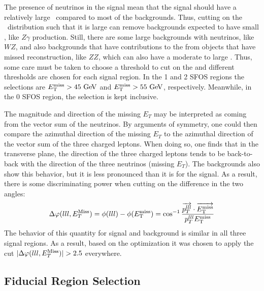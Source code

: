 The presence of neutrinos in the signal mean that the signal should have a 
relatively large \MET~compared to most of the backgrounds. Thus, 
cutting on the \MET~distribution such that it is large can remove backgrounds
expected to have small \MET, like $Z\gamma$ production.
Still, there are some large backgrounds with neutrinos, like $WZ$, 
and also backgrounds that have contributions to the \MET from objects that have
missed reconstruction, like $ZZ$, which can also have a moderate to large \MET.
Thus, some care must be taken to choose a threshold to cut on the \MET and
different thresholds are chosen for each signal 
region.
In the 1 and 2 SFOS regions the selections are $\MET > 45\GeV$
and $\MET > 55\GeV$, respectively. Meanwhile, in the 0 SFOS region, 
the \MET selection is kept inclusive.

The magnitude and direction
of the missing $E_{T}$ may be interpreted as coming from the 
vector sum of the neutrinos.  By arguments of 
symmetry, one could then compare the azimuthal direction 
of the missing $E_{T}$ to the azimuthal direction of the vector
sum of the three charged leptons. When doing so, one finds that 
in the transverse plane, 
the direction of the three charged leptons
tends to be back-to-back with the direction of the 
three neutrinos (missing $E_{T}$). The
backgrounds also show this behavior, but it is less pronounced than 
it is for the signal.  As a result, 
there is some discriminating power when cutting on the difference 
in the two angles: 
\begin{equation}
\Delta\varphi(lll,E_{T}^{\textrm{Miss}}) = \phi(lll)-\phi(E_{\mathrm{T}}^{\mathrm{miss}}) = \cos^{-1}\frac{ \overrightarrow{p_{T}^{lll}}\cdot\overrightarrow{E_{\mathrm{T}}^{\mathrm{miss}}} }{ p_{T}^{lll}E_{\mathrm{T}}^{\mathrm{miss}} } 
\end{equation}
The behavior of this quantity for signal and
background is similar in all three signal regions.
As a result, based on the 
optimization it was chosen to apply the cut
$|\Delta\varphi(lll,E_{T}^{\textrm{Miss}})| > 2.5$ everywhere.  



\subsection{Fiducial Region Selection}
\label{sec:fiducial}

